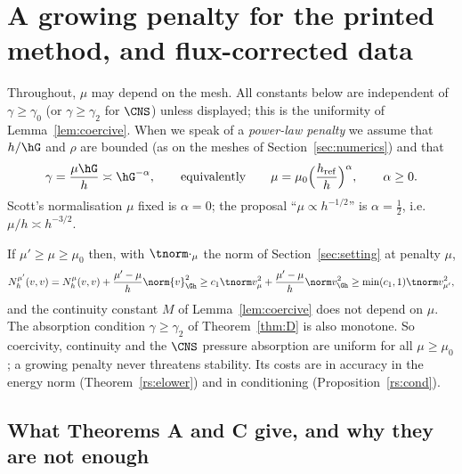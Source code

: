 
\section{A growing penalty for the printed method, and flux-corrected data}\label{rs:sec}

Throughout, $\mu$ may depend on the mesh. All constants below are independent of $\gamma\ge\gamma_0$ (or $\gamma\ge\gamma_2$ for $\CNS$) unless displayed; this is the uniformity of Lemma~\ref{lem:coercive}. When we speak of a \emph{power-law penalty} we assume that $h/\hG$ and $\rho$ are bounded (as on the meshes of Section~\ref{sec:numerics}) and that
\[
\gamma=\frac{\mu\hG}{h}\asymp\hG^{-\alpha},\qquad\text{equivalently}\qquad \mu=\mu_0\Bigl(\frac{h_{\mathrm{ref}}}{h}\Bigr)^{\alpha},\qquad \alpha\ge0 .
\]
Scott's normalisation $\mu$ fixed is $\alpha=0$; the proposal ``$\mu\propto h^{-1/2}$'' is $\alpha=\frac12$, i.e.\ $\mu/h\asymp h^{-3/2}$.

\begin{remark}\label{rs:coercive}
If $\mu'\ge\mu\ge\mu_0$ then, with $\tnorm\cdot_\mu$ the norm of Section~\ref{sec:setting} at penalty $\mu$,
\[
N_h^{\mu'}(v,v)=N_h^{\mu}(v,v)+\frac{\mu'-\mu}{h}\norm{v}^2_{\Gh}\ge c_1\tnorm v_\mu^2+\frac{\mu'-\mu}{h}\norm v^2_{\Gh}\ge\min(c_1,1)\tnorm v_{\mu'}^2 ,
\]
and the continuity constant $M$ of Lemma~\ref{lem:coercive} does not depend on $\mu$. The absorption condition $\gamma\ge\gamma_2$ of Theorem~\ref{thm:D} is also monotone. So coercivity, continuity and the $\CNS$ pressure absorption are uniform for all $\mu\ge\mu_0$; a growing penalty never threatens stability. Its costs are in accuracy in the energy norm (Theorem~\ref{rs:elower}) and in conditioning (Proposition~\ref{rs:cond}).
\end{remark}

\subsection{What Theorems A and C give, and why they are not enough}

